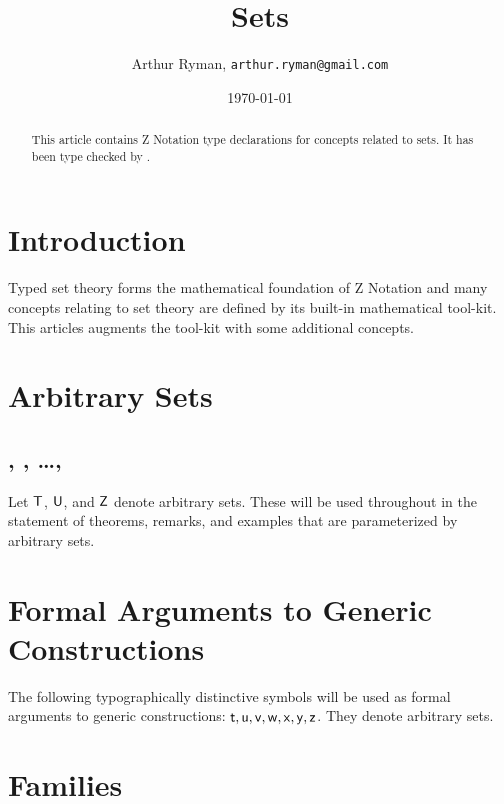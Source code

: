 \documentclass[11pt, oneside]{article}
\title{Sets}
\author{Arthur Ryman, {\tt arthur.ryman@gmail.com}}
\date{\today}
\begin{document}
\maketitle

\begin{abstract}
This article contains Z Notation type declarations for concepts related to sets.
It has been type checked by \fuzz.
\end{abstract}

\section{Introduction}

Typed set theory forms the mathematical foundation of Z Notation
and many concepts relating to set theory are defined by its built-in mathematical tool-kit. 
This articles augments the tool-kit with some additional concepts.

\section{Arbitrary Sets}

\subsection{, , \dots, }

Let $\mathsf{T}$, $\mathsf{U}$, and $\mathsf{Z}$ denote arbitrary sets.
These will be used throughout in the statement of theorems, remarks, and examples that are parameterized
by arbitrary sets.

\begin{zed}
	[\setT, \setU, \setV, \setW, \setX, \setY, \setZ]
\end{zed}

\section{Formal Arguments to Generic Constructions}

The following typographically distinctive symbols will be used as formal arguments to generic constructions:
$\mathsf{t}, \mathsf{u}, \mathsf{v}, \mathsf{w}, \mathsf{x}, \mathsf{y}, \mathsf{z}$. 
They denote arbitrary sets.

\section{Families}

\subsection{}
\end{document}
